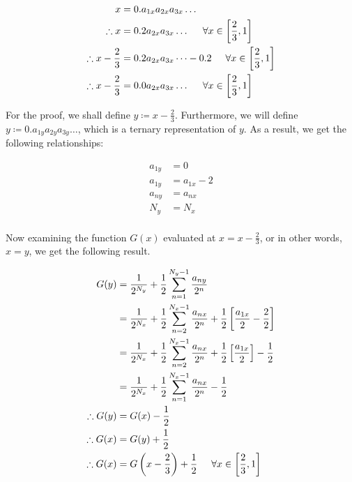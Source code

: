 \documentclass[a4paper]{article}
\begin{document}
\begin{enumerate}[label=\textbf{\arabic*.}]
\begin{enumerate}
		\begin{align*}
		x & = 0.a_{1x}a_{2x}a_{3x}\dots\\
		\therefore x & = 0.2a_{2x}a_{3x}\dots \hspace{5mm} \forall x \in \left[\frac{2}{3},1\right]\\
		\therefore x - \frac{2}{3} & = 0.2a_{2x}a_{3x}\dots - 0.2 \hspace{5mm} \forall x \in \left[\frac{2}{3},1\right]\\
		\therefore x - \frac{2}{3} & = 0.0a_{2x}a_{3x}\dots \hspace{5mm} \forall x \in \left[\frac{2}{3},1\right]\\
		\end{align*}

		For the proof, we shall define $y \coloneqq x - \frac{2}{3}$. Furthermore, we will define $y \coloneqq 0.a_{1y}a_{2y}a_{3y}\dots$, which is a ternary representation of $y$. As a result, we get the following relationships:

		\begin{align*}
		a_{1y} & = 0\\
		a_{1y} & = a_{1x} - 2\\
		a_{ny} & = a_{nx}\\
		N_y & = N_x\\
		\end{align*}

		Now examining the function $G(x)$ evaluated at $x=x-\frac{2}{3}$, or in other words, $x = y$, we get the following result.

		\begin{align*}
		G(y) & = \frac{1}{2^{N_y}} + \frac{1}{2}\sum_{n=1}^{N_y-1}\frac{a_{ny}}{2^{n}}\\
		& = \frac{1}{2^{N_x}} + \frac{1}{2}\sum_{n=2}^{N_x-1}\frac{a_{nx}}{2^{n}} + \frac{1}{2}\left[\frac{a_{1x}}{2} - \frac{2}{2}\right]\\
		& = \frac{1}{2^{N_x}} + \frac{1}{2}\sum_{n=2}^{N_x-1}\frac{a_{nx}}{2^{n}} + \frac{1}{2}\left[\frac{a_{1x}}{2}\right] - \frac{1}{2}\\
		& = \frac{1}{2^{N_x}} + \frac{1}{2}\sum_{n=1}^{N_x-1}\frac{a_{nx}}{2^{n}} - \frac{1}{2}\\
		\therefore G(y) & = G(x) - \frac{1}{2}\\
		\therefore G(x) & = G(y) + \frac{1}{2}\\
		\therefore G(x) & = G\left(x - \frac{2}{3}\right) + \frac{1}{2} \hspace{5mm} \forall x \in \left[\frac{2}{3},1\right]\\
		\end{align*}


\end{enumerate}
\end{enumerate}
\end{document}
